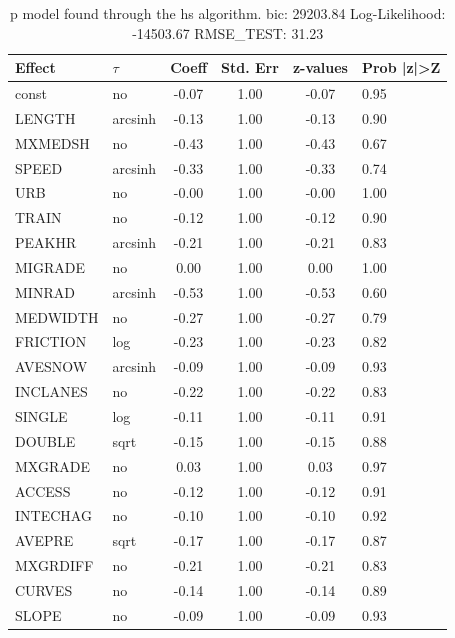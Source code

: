 \begin{table}
	\caption{p model found through the hs algorithm. bic: 29203.84 Log-Likelihood: -14503.67 RMSE_TEST: 31.23}
	\begin{center}
		\begin{tabular}{|l|l|c|c|c|l|}
			\hline
			Effect & $\tau$ & Coeff & Std. Err & z-values & Prob |z|>Z \\
			\hline
			const & no & -0.07 & 1.00 & -0.07 & 0.95 \\
			\hline
			LENGTH & arcsinh & -0.13 & 1.00 & -0.13 & 0.90 \\
			\hline
			MXMEDSH & no & -0.43 & 1.00 & -0.43 & 0.67 \\
			\hline
			SPEED & arcsinh & -0.33 & 1.00 & -0.33 & 0.74 \\
			\hline
			URB & no & -0.00 & 1.00 & -0.00 & 1.00 \\
			\hline
			TRAIN & no & -0.12 & 1.00 & -0.12 & 0.90 \\
			\hline
			PEAKHR & arcsinh & -0.21 & 1.00 & -0.21 & 0.83 \\
			\hline
			MIGRADE & no & 0.00 & 1.00 & 0.00 & 1.00 \\
			\hline
			MINRAD & arcsinh & -0.53 & 1.00 & -0.53 & 0.60 \\
			\hline
			MEDWIDTH & no & -0.27 & 1.00 & -0.27 & 0.79 \\
			\hline
			FRICTION & log & -0.23 & 1.00 & -0.23 & 0.82 \\
			\hline
			AVESNOW & arcsinh & -0.09 & 1.00 & -0.09 & 0.93 \\
			\hline
			INCLANES & no & -0.22 & 1.00 & -0.22 & 0.83 \\
			\hline
			SINGLE & log & -0.11 & 1.00 & -0.11 & 0.91 \\
			\hline
			DOUBLE & sqrt & -0.15 & 1.00 & -0.15 & 0.88 \\
			\hline
			MXGRADE & no & 0.03 & 1.00 & 0.03 & 0.97 \\
			\hline
			ACCESS & no & -0.12 & 1.00 & -0.12 & 0.91 \\
			\hline
			INTECHAG & no & -0.10 & 1.00 & -0.10 & 0.92 \\
			\hline
			AVEPRE & sqrt & -0.17 & 1.00 & -0.17 & 0.87 \\
			\hline
			MXGRDIFF & no & -0.21 & 1.00 & -0.21 & 0.83 \\
			\hline
			CURVES & no & -0.14 & 1.00 & -0.14 & 0.89 \\
			\hline
			SLOPE & no & -0.09 & 1.00 & -0.09 & 0.93 \\
			\hline

\end{tabular}
\end{center}
\end{table}
